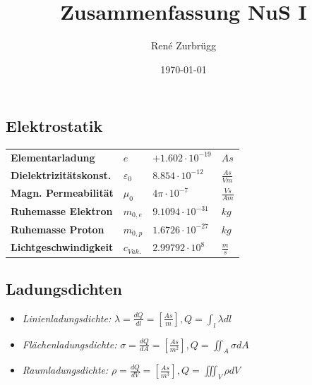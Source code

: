 \documentclass[a4paper, 6pt, landscape]{scrartcl}
\title{Zusammenfassung NuS I}
\author{René Zurbrügg}
\date{\today}
\begin{document}
\begin{multicols*}{4}
 \maketitle
	\section{Elektrostatik}
	\begin{tabular}{llll}
		\textbf{Elementarladung}        & $e  $             & $ +1.602\cdot 10^{-19}$ & $As$            \\
		\textbf{Dielektrizitätskonst.} & $\varepsilon_0  $ & $ 8.854\cdot 10^{-12}$  & $\frac{As}{Vm}$ \\
		\textbf{Magn. Permeabilität}   & $\mu_0  $         & $ 4\pi\cdot 10^{-7}$    & $\frac{Vs}{Am}$ \\
		\textbf{Ruhemasse Elektron}     & $m_{0,e}  $       & $ 9.1094\cdot 10^{-31}$ & $kg$            \\
		\textbf{Ruhemasse Proton}       & $m_{0,p}  $       & $ 1.6726\cdot 10^{-27}$ & $kg$            \\
		\textbf{Lichtgeschwindigkeit}   & $c_{Vak.}  $      & $ 2.99792\cdot 10^8$    & $\frac{m}{s}$   \\
	\end{tabular}



	\singlespacing
	\subsection{Ladungsdichten}
	\begin{itemize}
		\item \textit{Linienladungsdichte:} $\lambda=\frac{dQ}{dl}=\left[\frac{As}{m}\right], Q=\int_l\lambda dl$
		\item \textit{Flächenladungsdichte:} $\sigma=\frac{dQ}{dA}=\left[\frac{As}{m^2}\right], Q=\iint_A\sigma dA$
		\item \textit{Raumladungsdichte:} $\rho=\frac{dQ}{dV}=\left[\frac{As}{m^3}\right],Q=\iiint_V\rho dV$
	\end{itemize}


\end{multicols*}
\end{document}
